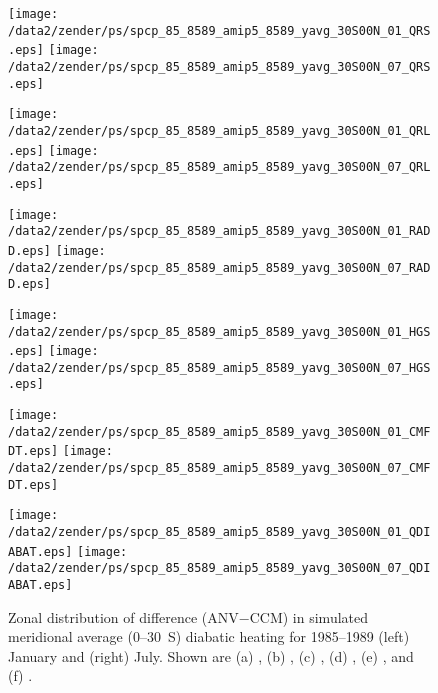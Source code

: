 \documentclass[twocolumn,final]{article}
\begin{document}
\begin{figure*}
\texttt{[image: /data2/zender/ps/spcp\_85\_8589\_amip5\_8589\_yavg\_30S00N\_01\_QRS.eps]}
\texttt{[image: /data2/zender/ps/spcp\_85\_8589\_amip5\_8589\_yavg\_30S00N\_07\_QRS.eps]}

\texttt{[image: /data2/zender/ps/spcp\_85\_8589\_amip5\_8589\_yavg\_30S00N\_01\_QRL.eps]}
\texttt{[image: /data2/zender/ps/spcp\_85\_8589\_amip5\_8589\_yavg\_30S00N\_07\_QRL.eps]}

\texttt{[image: /data2/zender/ps/spcp\_85\_8589\_amip5\_8589\_yavg\_30S00N\_01\_RADD.eps]}
\texttt{[image: /data2/zender/ps/spcp\_85\_8589\_amip5\_8589\_yavg\_30S00N\_07\_RADD.eps]}

\texttt{[image: /data2/zender/ps/spcp\_85\_8589\_amip5\_8589\_yavg\_30S00N\_01\_HGS.eps]}
\texttt{[image: /data2/zender/ps/spcp\_85\_8589\_amip5\_8589\_yavg\_30S00N\_07\_HGS.eps]}

\texttt{[image: /data2/zender/ps/spcp\_85\_8589\_amip5\_8589\_yavg\_30S00N\_01\_CMFDT.eps]}
\texttt{[image: /data2/zender/ps/spcp\_85\_8589\_amip5\_8589\_yavg\_30S00N\_07\_CMFDT.eps]}

\texttt{[image: /data2/zender/ps/spcp\_85\_8589\_amip5\_8589\_yavg\_30S00N\_01\_QDIABAT.eps]}
\texttt{[image: /data2/zender/ps/spcp\_85\_8589\_amip5\_8589\_yavg\_30S00N\_07\_QDIABAT.eps]}
\caption[Zonal distribution of difference (ANV$-$CCM) in simulated
meridional average (0--30~\degreee S) diabatic heating for 1985--1989
January and July.]{
Zonal distribution of difference (ANV$-$CCM) in simulated meridional
average (0--30~\degreee S) diabatic heating for 1985--1989 (left)
January and (right) July. 
Shown are (a) \QRL, (b) \QRS, (c) \QR, (d) \QLS, (e) \QC, and (f) \QT.
\label{fig:yavg_30S00N_8589_QT}}
\end{figure*}
\clearpage
\end{document}
